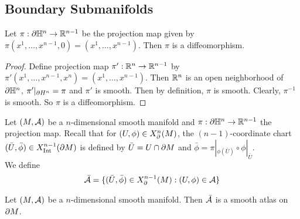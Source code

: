 \documentclass{book}
\begin{document}
\subsection{Boundary Submanifolds}

\begin{ex} 
	Let $\pi: \partial \mathbb{H}^n \rightarrow \mathbb{R}^{n-1}$ be the projection map given by $\pi(x^1, \ldots, x^{n-1}, 0) = (x^1, \ldots, x^{n-1})$. Then $\pi$ is a diffeomorphism. 
\end{ex}

\begin{proof}
	Define projection map $\pi': \mathbb{R}^n \rightarrow \mathbb{R}^{n-1}$ by $\pi'(x^1, \ldots, x^{n-1}, x^n) = (x^1, \ldots, x^{n-1})$. Then $\mathbb{R}^n$ is an open neighborhood of $\partial \mathbb{H}^n$, $\pi'|_{\partial H^n} = \pi$ and $\pi'$ is smooth. Then by definition, $\pi$ is smooth. Clearly, $\pi^{-1}$ is smooth. So $\pi$ is a diffeomorphism.
\end{proof}

\begin{defn} 
	Let $(M, \mathcal{A})$ be a $n$-dimensional smooth manifold and $\pi: \partial \mathbb{H}^n \rightarrow \mathbb{R}^{n-1}$ the projection map. Recall that for $(U, \phi) \in X^n_{\partial}(M)$, the $(n-1)$-coordinate chart $(\bar{U}, \bar{\phi}) \in X^{n-1}_{\operatorname{Int}}(\partial M)$ is defined by $\bar{U} = U \cap \partial M$ and $\bar{\phi} = \pi|_{\phi(\bar{U})} \circ \phi|_{\bar{U}}$. \\
	We define 
	$$\bar{\mathcal{A}} = \{(\bar{U}, \bar{\phi}) \in X^{n-1}_{\partial}(M): (U, \phi) \in \mathcal{A} \}$$
\end{defn}

\begin{ex} 
	Let $(M, \mathcal{A})$ be a $n$-dimensional smooth manifold. Then $\bar{\mathcal{A}}$ is a smooth atlas on $\partial M$.
\end{ex}
\end{document}
